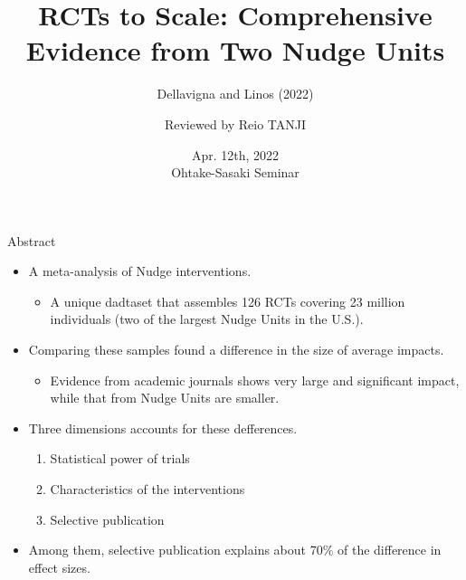 \documentclass[dvipdfmx,11pt]{beamer}
\title[Dellavigna and Linos (2022, Econometrica)]{RCTs to Scale: Comprehensive Evidence from Two Nudge Units}
\subtitle{Dellavigna and Linos (2022)}
\author{Reviewed by Reio TANJI}
\date{Apr. 12th, 2022 \\ Ohtake-Sasaki Seminar}
\institute[OU Graduate School of Economics]{Osaka University, Graduate School of Economics}
\begin{document}
\begin{frame}\frametitle{}
\titlepage
\end{frame}

\begin{frame}{Abstract}
  \begin{itemize}
    \item A meta-analysis of Nudge interventions.
    \begin{itemize}
      \item A unique dadtaset that assembles 126 RCTs covering 23 million individuals (two of the largest Nudge Units in the U.S.).
    \end{itemize}
    \item Comparing these samples found a difference in the size of average impacts.
    \begin{itemize}
      \item Evidence from academic journals shows very large and significant impact, while that from Nudge Units are smaller.
    \end{itemize}
    \item Three dimensions accounts for these defferences.
    \begin{enumerate}
      \item Statistical power of trials
      \item Characteristics of the interventions
      \item Selective publication
    \end{enumerate}
    \item Among them, selective publication explains about 70\% of the difference in effect sizes.
  \end{itemize}
\end{frame}
\end{document}
